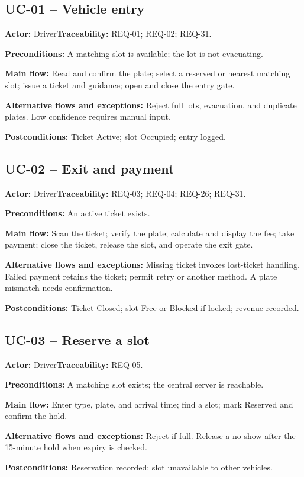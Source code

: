 \subsection{UC-01 -- Vehicle entry}
\noindent\textbf{Actor:} Driver\quad\textbf{Traceability:} REQ-01; REQ-02; REQ-31.
\par\textbf{Preconditions:} A matching slot is available; the lot is not evacuating.
\par\textbf{Main flow:} Read and confirm the plate; select a reserved or nearest matching slot; issue a ticket and guidance; open and close the entry gate.
\par\textbf{Alternative flows and exceptions:} Reject full lots, evacuation, and duplicate plates. Low confidence requires manual input.
\par\textbf{Postconditions:} Ticket Active; slot Occupied; entry logged.
\subsection{UC-02 -- Exit and payment}
\noindent\textbf{Actor:} Driver\quad\textbf{Traceability:} REQ-03; REQ-04; REQ-26; REQ-31.
\par\textbf{Preconditions:} An active ticket exists.
\par\textbf{Main flow:} Scan the ticket; verify the plate; calculate and display the fee; take payment; close the ticket, release the slot, and operate the exit gate.
\par\textbf{Alternative flows and exceptions:} Missing ticket invokes lost-ticket handling. Failed payment retains the ticket; permit retry or another method. A plate mismatch needs confirmation.
\par\textbf{Postconditions:} Ticket Closed; slot Free or Blocked if locked; revenue recorded.
\subsection{UC-03 -- Reserve a slot}
\noindent\textbf{Actor:} Driver\quad\textbf{Traceability:} REQ-05.
\par\textbf{Preconditions:} A matching slot exists; the central server is reachable.
\par\textbf{Main flow:} Enter type, plate, and arrival time; find a slot; mark Reserved and confirm the hold.
\par\textbf{Alternative flows and exceptions:} Reject if full. Release a no-show after the 15-minute hold when expiry is checked.
\par\textbf{Postconditions:} Reservation recorded; slot unavailable to other vehicles.
